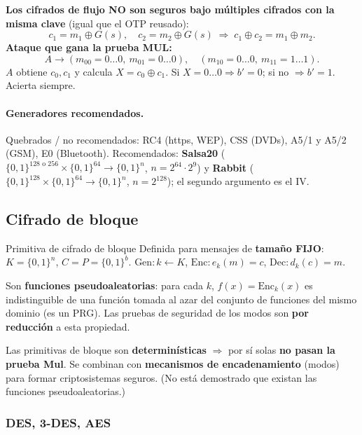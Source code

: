 \documentclass[../main.tex]{subfiles}
\begin{document}
\begin{examen}
\textbf{Los cifrados de flujo NO son seguros bajo múltiples cifrados con la
misma clave} (igual que el OTP reusado):
$$c_1 = m_1\oplus G(s),\quad c_2 = m_2\oplus G(s)\;\Rightarrow\; c_1\oplus c_2 = m_1\oplus m_2.$$
\textbf{Ataque que gana la prueba MUL:}
$$A \to (m_{00}{=}0\dots0,\ m_{01}{=}0\dots0),\quad (m_{10}{=}0\dots0,\ m_{11}{=}1\dots1).$$
$A$ obtiene $c_0, c_1$ y calcula $X=c_0\oplus c_1$. Si $X=0\dots0 \Rightarrow b'{=}0$;
si no $\Rightarrow b'{=}1$. Acierta siempre.
\end{examen}

\paragraph{Generadores recomendados.} Quebrados / no recomendados: RC4
(https, WEP), CSS (DVDs), A5/1 y A5/2 (GSM), E0 (Bluetooth). Recomendados:
\textbf{Salsa20} ($\{0,1\}^{128\text{ o }256}\times\{0,1\}^{64}\to\{0,1\}^n$,
$n=2^{64}\cdot2^9$) y \textbf{Rabbit}
($\{0,1\}^{128}\times\{0,1\}^{64}\to\{0,1\}^n$, $n=2^{128}$); el segundo
argumento es el IV.

\subsection{Cifrado de bloque}

\begin{definicion}{Primitiva de cifrado de bloque}
Definida para mensajes de \textbf{tamaño FIJO}: $K=\{0,1\}^n$, $C=P=\{0,1\}^b$.
$\text{Gen}: k\leftarrow K$, $\text{Enc}: e_k(m)=c$, $\text{Dec}: d_k(c)=m$.
\end{definicion}

Son \textbf{funciones pseudoaleatorias}: para cada $k$, $f(x)=\text{Enc}_k(x)$
es indistinguible de una función tomada al azar del conjunto de funciones del
mismo dominio (es un PRG). Las pruebas de seguridad de los modos son
\textbf{por reducción} a esta propiedad.

\begin{ojo}
Las primitivas de bloque son \textbf{determinísticas} $\Rightarrow$ por sí
solas \textbf{no pasan la prueba Mul}. Se combinan con \textbf{mecanismos de
encadenamiento} (modos) para formar criptosistemas seguros. (No está demostrado
que existan las funciones pseudoaleatorias.)
\end{ojo}

\subsubsection{DES, 3-DES, AES}
\end{document}

